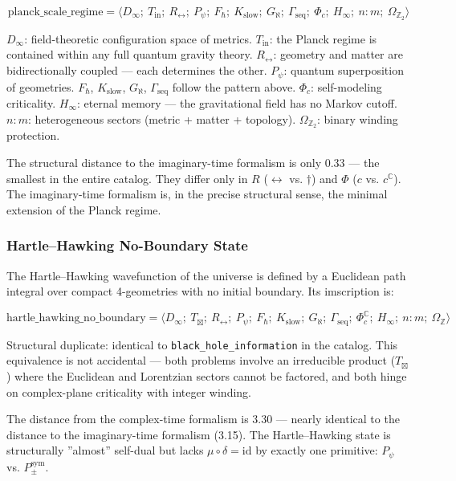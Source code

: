 \documentclass[12pt,a4paper]{article}
\begin{document}
\[\text{planck\_scale\_regime} = \langle D_{\infty};\ T_{\text{in}};\ R_{\leftrightarrow};\ P_{\psi};\ F_{\hbar};\ K_{\text{slow}};\ G_{\aleph};\ \Gamma_{\text{seq}};\ \Phi_c;\ H_{\infty};\ n{:}m;\ \Omega_{\mathbb{Z}_2} \rangle\]

$D_{\infty}$: field-theoretic configuration space of metrics. $T_{\text{in}}$: the Planck regime is contained within any full quantum gravity theory. $R_{\leftrightarrow}$: geometry and matter are bidirectionally coupled --- each determines the other. $P_{\psi}$: quantum superposition of geometries. $F_{\hbar}$, $K_{\text{slow}}$, $G_{\aleph}$, $\Gamma_{\text{seq}}$ follow the pattern above. $\Phi_c$: self-modeling criticality. $H_{\infty}$: eternal memory --- the gravitational field has no Markov cutoff. $n{:}m$: heterogeneous sectors (metric + matter + topology). $\Omega_{\mathbb{Z}_2}$: binary winding protection.

The structural distance to the imaginary-time formalism is only 0.33 --- the smallest in the entire catalog. They differ only in $R$ ($\leftrightarrow$ vs. $\dagger$) and $\Phi$ ($c$ vs. $c^\mathbb{C}$). The imaginary-time formalism is, in the precise structural sense, the minimal extension of the Planck regime.

\subsubsection{Hartle--Hawking No-Boundary State}

The Hartle--Hawking wavefunction of the universe is defined by a Euclidean path integral over compact 4-geometries with no initial boundary. Its imscription is:

\[\text{hartle\_hawking\_no\_boundary} = \langle D_{\infty};\ T_{\boxtimes};\ R_{\leftrightarrow};\ P_{\psi};\ F_{\hbar};\ K_{\text{slow}};\ G_{\aleph};\ \Gamma_{\text{seq}};\ \Phi_c^\mathbb{C};\ H_{\infty};\ n{:}m;\ \Omega_\mathbb{Z} \rangle\]

Structural duplicate: identical to \texttt{black\_hole\_information} in the catalog. This equivalence is not accidental --- both problems involve an irreducible product ($T_{\boxtimes}$) where the Euclidean and Lorentzian sectors cannot be factored, and both hinge on complex-plane criticality with integer winding.

The distance from the complex-time formalism is 3.30 --- nearly identical to the distance to the imaginary-time formalism (3.15). The Hartle--Hawking state is structurally ''almost'' self-dual but lacks $\mu \circ \delta = \text{id}$ by exactly one primitive: $P_{\psi}$ vs. $P_{\pm}^{\text{sym}}$.
\end{document}
